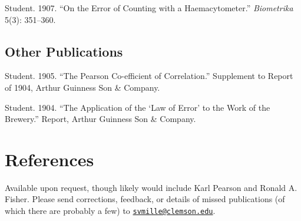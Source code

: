 \documentclass[11pt,]{article}
\begin{document}
Student. 1907. ``On the Error of Counting with a Haemacytometer.''
\emph{Biometrika} 5(3): 351--360.

\hypertarget{other-publications}{%
\subsection{Other Publications}\label{other-publications}}

Student. 1905. ``The Pearson Co-efficient of Correlation.'' Supplement
to Report of 1904, Arthur Guinness Son \& Company.

Student. 1904. ``The Application of the `Law of Error' to the Work of
the Brewery.'' Report, Arthur Guinness Son \& Company.

\hypertarget{references}{%
\section{References}\label{references}}

Available upon request, though likely would include Karl Pearson and
Ronald A. Fisher. Please send corrections, feedback, or details of
missed publications (of which there are probably a few) to
\href{mailto:svmille@clemson.edu}{\nolinkurl{svmille@clemson.edu}}.
\end{document}
